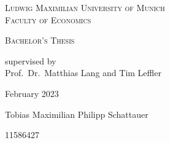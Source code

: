 \begin{titlepage}
    \vspace*{\fill}
    \centering

    \textsc{\Large Ludwig Maximilian University of Munich}\\
    \textsc{Faculty of Economics}


    \vspace{4cm}

    \begin{doublespace}
        \makeatletter
        \textsc{ \Huge \@title}
        \textsc{\Large \@subtitle}
        \makeatother
    \end{doublespace}


    \vspace{3cm}
    \huge \textsc{Bachelor's Thesis}



    \vspace{0.3cm}
    \large \textrm{supervised by\\Prof.~Dr.~Matthias Lang and Tim Leffler}

    \vspace{2cm}
    \huge
    \textrm{February 2023}

    \vspace{2cm}
    \Large \textrm{Tobias Maximilian Philipp Schattauer}

    11586427

    \vspace*{\fill}
\end{titlepage}





